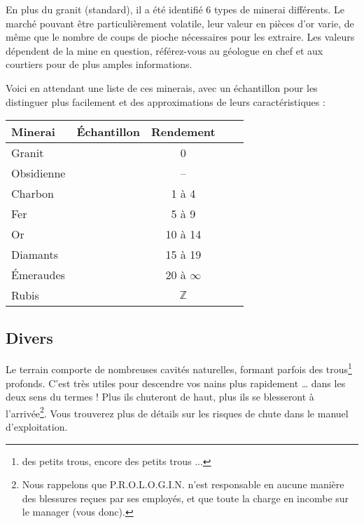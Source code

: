   En plus du granit (standard), il a été identifié 6 types de minerai
  différents.  Le marché pouvant être particulièrement volatile, leur valeur en
  pièces d'or varie, de même que le nombre de coups de pioche nécessaires pour
  les extraire. Les valeurs dépendent de la mine en question, référez-vous au
  géologue en chef et aux courtiers pour de plus amples informations.

  Voici en attendant une liste de ces minerais, avec un échantillon pour les
  distinguer plus facilement et des approximations de leurs caractéristiques :
  \begin{center}
    \begin{tabular}{|l|Sc|c|c|}
      \hline
      Minerai & Échantillon & Rendement \\
      \hline
      Granit &  & 0 \\
      \hline
      Obsidienne &  & -- \\
      \hline
      Charbon &  & 1 à 4 \\
      \hline
      Fer &  & 5 à 9 \\
      \hline
      Or &  & 10 à 14 \\
      \hline
      Diamants &  & 15 à 19
      \\
      \hline
      Émeraudes &  & 20 à
      $\infty$
      \\
      \hline
      Rubis &  & $\mathbb{Z}$ \\
      \hline
    \end{tabular}
  \end{center}

\subsection{Divers}

  Le terrain comporte de nombreuses cavités naturelles, formant parfois des
  trous\footnote{des petits trous, encore des petits trous ...} profonds. C'est
  très utiles pour descendre vos nains plus rapidement \ldots{} dans les deux
  sens du termes ! Plus ils chuteront de haut, plus ils se blesseront à
  l'arrivée\footnote{Nous rappelons que P.R.O.L.O.G.I.N. n'est responsable en
  aucune manière des blessures reçues par ses employés, et que toute la charge
  en incombe sur le manager (vous donc).}. Vous trouverez plus de détails sur
  les risques de chute dans le manuel d'exploitation.

